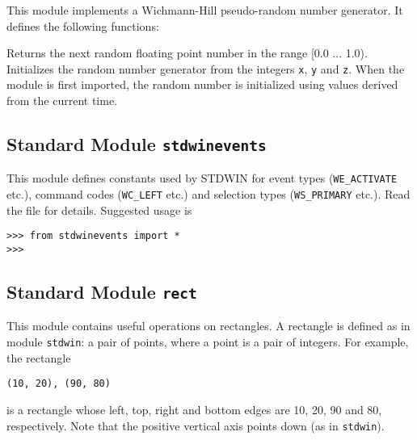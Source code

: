 This module implements a Wichmann-Hill pseudo-random number generator.
It defines the following functions:
\begin{description}
Returns the next random floating point number in the range [0.0 ... 1.0).
Initializes the random number generator from the integers
{\tt x},
{\tt y}
and
{\tt z}.
When the module is first imported, the random number is initialized
using values derived from the current time.
\end{description}

\subsection{Standard Module {\tt stdwinevents}}

This module defines constants used by STDWIN for event types
({\tt WE\_ACTIVATE} etc.), command codes ({\tt WC\_LEFT} etc.)
and selection types ({\tt WS\_PRIMARY} etc.).
Read the file for details.
Suggested usage is
\bcode\begin{verbatim}
>>> from stdwinevents import *
>>>
\end{verbatim}\ecode

\subsection{Standard Module {\tt rect}}

This module contains useful operations on rectangles.
A rectangle is defined as in module
{\tt stdwin}:
a pair of points, where a point is a pair of integers.
For example, the rectangle
\bcode\begin{verbatim}
(10, 20), (90, 80)
\end{verbatim}\ecode
is a rectangle whose left, top, right and bottom edges are 10, 20, 90
and 80, respectively.
Note that the positive vertical axis points down (as in
{\tt stdwin}).

